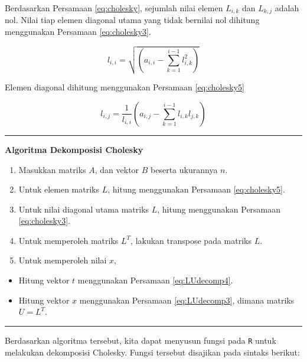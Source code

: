 \documentclass[]{book}
\providecommand{\tightlist}{%
  \setlength{\itemsep}{0pt}\setlength{\parskip}{0pt}}
\theoremstyle{definition}
\theoremstyle{definition}
\theoremstyle{definition}
\theoremstyle{remark}
\begin{document}
Berdasarkan Persamaan \eqref{eq:cholesky}, sejumlah nilai elemen \(L_{i,k}\) dan \(L_{k,j}\) adalah nol. Nilai tiap elemen diagonal utama yang tidak bernilai nol dihitung menggunakan Persamaan \eqref{eq:cholesky3}.

\begin{equation}
l_{i,i}=\sqrt{\left(a_{i,i}-\sum_{k=1}^{i-1}l_{i,k}^2\right)}
  \label{eq:cholesky3}
\end{equation}

Elemen diagonal dihitung menggunakan Persamaan \eqref{eq:cholesky5}

\begin{equation}
l_{i,j}=\frac{1}{l_{i,i}}\left(a_{i,j}-\sum_{k=1}^{i-1}l_{i,k}l_{j,k}\right)
  \label{eq:cholesky5}
\end{equation}

\begin{center}\rule{0.5\linewidth}{\linethickness}\end{center}

\textbf{Algoritma Dekomposisi Cholesky}

\begin{enumerate}
\def\labelenumi{\arabic{enumi}.}
\tightlist
\item
  Masukkan matriks \(A\), dan vektor \(B\) beserta ukurannya \(n\).
\item
  Untuk elemen matriks \(L\), hitung menggunakan Persamaan \eqref{eq:cholesky5}.
\item
  Untuk nilai diagonal utama matriks \(L\), hitung menggunakan Persamaan \eqref{eq:cholesky3}.
\item
  Untuk memperoleh matriks \(L^T\), lakukan transpose pada matriks \(L\).
\item
  Untuk memperoleh nilai \(x\),
\end{enumerate}

\begin{itemize}
\tightlist
\item
  Hitung vektor \(t\) menggunakan Persamaan \eqref{eq:LUdecomp4}.
\item
  Hitung vektor \(x\) menggunakan Persamaan \eqref{eq:LUdecomp3}, dimana matriks \(U=L^T\).
\end{itemize}

\begin{center}\rule{0.5\linewidth}{\linethickness}\end{center}

Berdasarkan algoritma tersebut, kita dapat menyusun fungsi pada \texttt{R} untuk melakukan dekomposisi Cholesky. Fungsi tersebut disajikan pada sintaks berikut:
\end{document}
